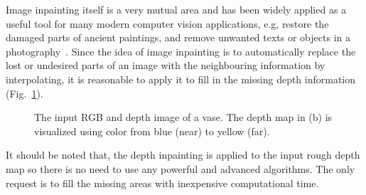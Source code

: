 
Image inpainting itself is a very mutual area and has been widely applied as a useful tool for many modern computer vision applications, e.g, restore the damaged parts of ancient paintings, and remove unwanted texts or objects in a photography~\cite{bertalmio2000image}. 
Since the idea of image inpainting is to automatically replace the lost or undesired parts of an image with the neighbouring information by interpolating, it is reasonable to apply it to fill in the missing depth information (Fig.~\ref{fig:inpainting1}).

\begin{figure}[!htbp]
\centering
{}
\caption{The input RGB and depth image of a vase. The depth map in (b) is visualized using color from blue (near) to yellow (far).}
\label{fig:inpainting1}
\end{figure}

It should be noted that, the depth inpainting is applied to the input rough depth map so there is no need to use any powerful and advanced algorithms.
The only request is to fill the missing areas with inexpensive computational time.

